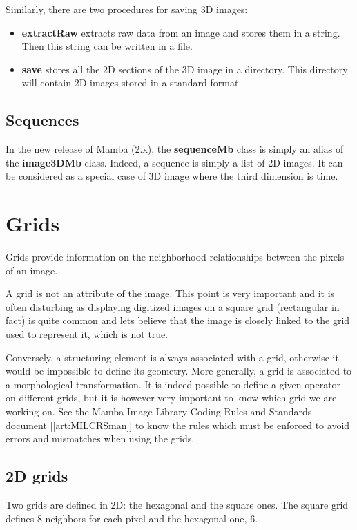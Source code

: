\documentclass[a4paper,10pt,oneside]{article}
\begin{document}
Similarly, there are two procedures for saving 3D images:

\begin{itemize}
\item \textbf{extractRaw} extracts raw data from an image and stores them in a string. Then this string can be
written in a file.  
\item \textbf{save} stores all the 2D sections of the 3D image in a directory. This directory will contain 2D images
stored in a standard format.
\end{itemize}

\subsection{Sequences}
In the new release of Mamba (2.x), the \textbf{sequenceMb} class is simply an alias of the \textbf{image3DMb} class.
Indeed, a sequence is simply a list of 2D images. It can be considered as a special case of 3D image where
the third dimension is time.

\section{Grids}
Grids provide information on the neighborhood relationships between the pixels of an image.

A grid is not an attribute of the image. This point is very important and it is often disturbing as
displaying digitized images on a square grid (rectangular in fact) is quite common and lets believe that
the image is closely linked to the grid used to represent it, which is not true.

Conversely, a structuring element is always associated with a grid, otherwise it would be impossible
to define its geometry. More generally, a grid is associated to a morphological transformation. It is
indeed possible to define a given operator on different grids, but it is however very important to
know which grid we are working on. See the Mamba Image Library Coding Rules and Standards document [\ref{art:MILCRSman}] to
know the rules which must be enforced to avoid errors and mismatches when using the grids.

\subsection{2D grids}
\label{cha:2Dgrids}
Two grids are defined in 2D: the hexagonal and the square ones. 
The square grid defines 8 neighbors for each pixel and the hexagonal one, 6.
\end{document}
